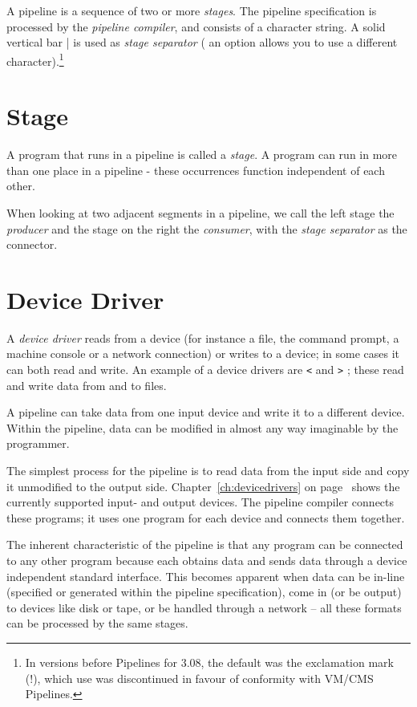 A pipeline is a sequence of two or more \emph{stages}.
The pipeline specification is processed by the \emph{pipeline
compiler}, and consists of a character string.  A
solid vertical bar | is used as \emph{stage separator} ( an option allows
you to use a different character).\footnote{In versions
before Pipelines for \nr{} 3.08, the default was the exclamation
mark (!), which use was discontinued in favour of conformity with
VM/CMS Pipelines.}

\section{Stage}
A program that runs in a pipeline is called a \emph{stage}. A program
can run in more than one place in a pipeline - these occurrences
function independent of each other.

When looking at two adjacent segments in a pipeline, we call the left
stage the \emph{producer} and the stage on the right the
\emph{consumer}, with the \emph{stage separator} as the connector.

\section{Device Driver}
A \emph{device driver} reads from a device (for instance a file, the
command prompt, a machine console or a network connection) or writes
to a device; in some cases it can both read and write. An example of a
device drivers are \texttt{<} and \texttt{>} ; these read and write data from and to files.

A pipeline can take data from one input device and write it to a
different device. Within the pipeline, data can be modified in almost
any way imaginable by the programmer.

The simplest process for the pipeline is to read data from the input
side and copy it unmodified to the output side. Chapter~\ref{ch:devicedrivers} on page~\pageref{ch:devicedrivers} shows the
currently supported input- and output devices. The pipeline compiler
connects these programs; it uses one program for each device and
connects them together.

The inherent characteristic of the pipeline is that any program can be
connected to any other program because each obtains data and sends
data through a device independent standard interface. This becomes
apparent when data can be in-line (specified or generated within the
pipeline specification), come in (or be output) to devices like disk
or tape, or be handled through a network -- all these formats can be
processed by the same stages.

